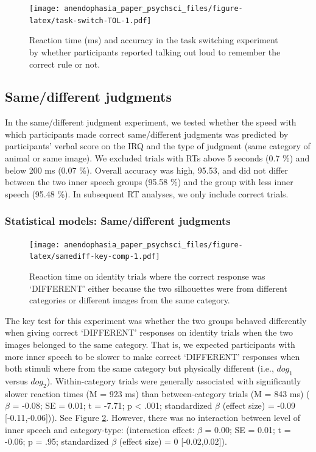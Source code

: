 \documentclass[
  man,a4paper,floatsintext]{apa6}
\begin{document}
\begin{figure}
\centering
\texttt{[image: anendophasia\_paper\_psychsci\_files/figure-latex/task-switch-TOL-1.pdf]}
\caption{\label{fig:task-switch-TOL}Reaction time (ms) and accuracy in the task switching experiment by whether participants reported talking out loud to remember the correct rule or not.}
\end{figure}

\hypertarget{samedifferent-judgments}{%
\subsection{Same/different judgments}\label{samedifferent-judgments}}

In the same/different judgment experiment, we tested whether the speed with which participants made correct same/different judgments was predicted by participants' verbal score on the IRQ and the type of judgment (same category of animal or same image). We excluded trials with RTs above 5 seconds (0.7 \%) and below 200 ms (0.07 \%). Overall accuracy was high, 95.53, and did not differ between the two inner speech groups (95.58 \%) and the group with less inner speech (95.48 \%). In subsequent RT analyses, we only include correct trials.

\hypertarget{statistical-models-samedifferent-judgments}{%
\subsubsection{Statistical models: Same/different judgments}\label{statistical-models-samedifferent-judgments}}

\begin{figure}
\centering
\texttt{[image: anendophasia\_paper\_psychsci\_files/figure-latex/samediff-key-comp-1.pdf]}
\caption{\label{fig:samediff-key-comp}Reaction time on identity trials where the correct response was `DIFFERENT' either because the two silhouettes were from different categories or different images from the same category.}
\end{figure}

The key test for this experiment was whether the two groups behaved differently when giving correct `DIFFERENT' responses on identity trials when the two images belonged to the same category. That is, we expected participants with more inner speech to be slower to make correct `DIFFERENT' responses when both stimuli where from the same category but physically different (i.e., \(dog_1\) versus \(dog_2\)). Within-category trials were generally associated with significantly slower reaction times (M = 923 ms) than between-category trials (M = 843 ms) (\(\beta\) = -0.08; SE = 0.01; t = -7.71; p \textless{} .001; standardized \(\beta\) (effect size) = -0.09 {[}-0.11,-0.06{]})). See Figure \ref{fig:samediff-key-comp}. However, there was no interaction between level of inner speech and category-type: (interaction effect: \(\beta\) = 0.00; SE = 0.01; t = -0.06; p = .95; standardized \(\beta\) (effect size) = 0 {[}-0.02,0.02{]}).
\end{document}
